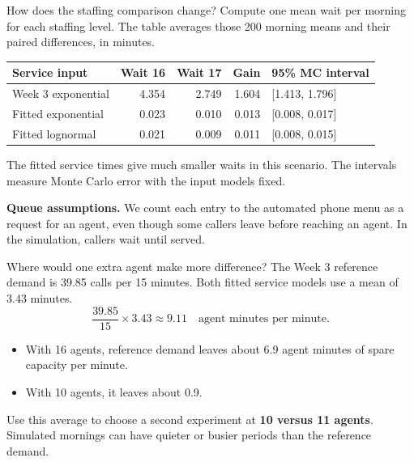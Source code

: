 \documentclass{beamer}
\begin{document}
\begin{frame}{How does the staffing comparison change?}
  \small
  Compute one mean wait per morning for each staffing level. The table
  averages those 200 morning means and their paired differences, in minutes.

  \vspace{0.7em}
  \centering
  \begin{tabular}{@{}lrrrl@{}}
    \toprule
    Service input & Wait 16 & Wait 17 & Gain & 95\% MC interval\\
    \midrule
    Week 3 exponential & 4.354 & 2.749 & 1.604 & [1.413, 1.796]\\
    Fitted exponential & 0.023 & 0.010 & 0.013 & [0.008, 0.017]\\
    Fitted lognormal   & 0.021 & 0.009 & 0.011 & [0.008, 0.015]\\
    \bottomrule
  \end{tabular}

  \vspace{0.6em}
  \raggedright
  The fitted service times give much smaller waits in this scenario.
  The intervals measure Monte Carlo error with the input models fixed.

  \vspace{0.4em}
  \textbf{Queue assumptions.} We count each entry to the automated phone
  menu as a request for an agent, even though some callers leave before
  reaching an agent. In the simulation, callers wait until served.
\end{frame}

\begin{frame}{Where would one extra agent make more difference?}
  The Week 3 reference demand is 39.85 calls per 15 minutes. Both fitted
  service models use a mean of 3.43 minutes.
  \[
    \frac{39.85}{15} \times 3.43
    \approx 9.11 \quad \text{agent minutes per minute}.
  \]

  \begin{itemize}
    \item With 16 agents, reference demand leaves about 6.9 agent minutes
      of spare capacity per minute.
    \item With 10 agents, it leaves about 0.9.
  \end{itemize}

  Use this average to choose a second experiment at \textbf{10 versus 11
  agents}. Simulated mornings can have quieter or busier periods than the
  reference demand.
\end{frame}
\end{document}
